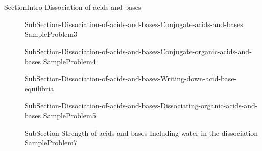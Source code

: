 \documentclass[main.tex]{subfiles}
\newcommand\chapterlabel{Ch-acidbase}\setcounter{figurenewcounter}{0}\setcounter{tablenewcounter}{0}\setcounter{formulanewcounter}{0}
\begin{document}
\section{\color{blue!30!black}{Dissociation of acids and bases}}{SectionIntro-Dissociation-of-acids-and-bases}
\sloppy\begin{description}
\item[] {SubSection-Dissociation-of-acids-and-bases-Conjugate-acids-and-bases}
{SampleProblem3}
\item[] {SubSection-Dissociation-of-acids-and-bases-Conjugate-organic-acids-and-bases}
{SampleProblem4}
\item[] {SubSection-Dissociation-of-acids-and-bases-Writing-down-acid-base-equilibria}
\item[] {SubSection-Dissociation-of-acids-and-bases-Dissociating-organic-acids-and-bases}
{SampleProblem5}
\item[] {SubSection-Strength-of-acids-and-bases-Including-water-in-the-dissociation}
{SampleProblem7}
\end{description}
\end{document}
